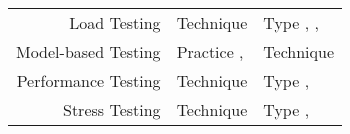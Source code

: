 \begin{paperTable}
\begin{minipage}{\linewidth}
\begin{tabular}{|r|l|l|}
            Load Testing             & Technique \cite[p.~38]{IEEE2021b}                                   & Type \cite[p.~253]{IEEE2017}, \cite[pp.~5, 20, 22]{IEEE2022}, \cite{ISTQB}                                                                 \\
            Model-based Testing      & Practice \cite[p.~22]{IEEE2022}, \cite[p.~viii]{IEEE2021b}          & Technique \cite[p.~4]{Kam2008}                                                                                                             \\
            Performance Testing      & Technique \cite[p.~38]{IEEE2021b}                                   & Type \cite[pp.~7, 22, 26\==27]{IEEE2022}, \cite[p.~7]{IEEE2021b}                                                                           \\
            Stress Testing           & Technique \cite[p.~38]{IEEE2021b}                                   & Type \cite[p.~442]{IEEE2017}, \cite[pp.~9, 22]{IEEE2022}                                                                                   \\
            \hline
        \end{tabular}
    \end{minipage}
\end{paperTable}
